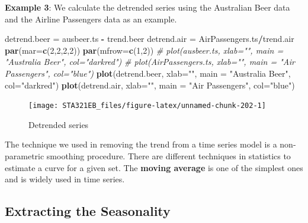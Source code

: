 \documentclass[
]{book}
\newenvironment{Shaded}{\begin{snugshade}}{\end{snugshade}}
\newcommand{\AttributeTok}[1]{\textcolor[rgb]{0.13,0.29,0.53}{#1}}
\newcommand{\CommentTok}[1]{\textcolor[rgb]{0.56,0.35,0.01}{\textit{#1}}}
\newcommand{\DecValTok}[1]{\textcolor[rgb]{0.00,0.00,0.81}{#1}}
\newcommand{\FunctionTok}[1]{\textcolor[rgb]{0.13,0.29,0.53}{\textbf{#1}}}
\newcommand{\NormalTok}[1]{#1}
\newcommand{\OtherTok}[1]{\textcolor[rgb]{0.56,0.35,0.01}{#1}}
\newcommand{\SpecialCharTok}[1]{\textcolor[rgb]{0.81,0.36,0.00}{\textbf{#1}}}
\newcommand{\StringTok}[1]{\textcolor[rgb]{0.31,0.60,0.02}{#1}}
\begin{document}
\textbf{Example 3}: We calculate the detrended series using the Australian Beer data and the Airline Passengers data as an example.

\begin{Shaded}
\begin{Highlighting}[]
\NormalTok{detrend.beer }\OtherTok{=}\NormalTok{ ausbeer.ts }\SpecialCharTok{{-}}\NormalTok{ trend.beer}
\NormalTok{detrend.air }\OtherTok{=}\NormalTok{ AirPassengers.ts}\SpecialCharTok{/}\NormalTok{trend.air}
\FunctionTok{par}\NormalTok{(}\AttributeTok{mar=}\FunctionTok{c}\NormalTok{(}\DecValTok{2}\NormalTok{,}\DecValTok{2}\NormalTok{,}\DecValTok{2}\NormalTok{,}\DecValTok{2}\NormalTok{))}
\FunctionTok{par}\NormalTok{(}\AttributeTok{mfrow=}\FunctionTok{c}\NormalTok{(}\DecValTok{1}\NormalTok{,}\DecValTok{2}\NormalTok{))}
\CommentTok{\# plot(ausbeer.ts, xlab="", main = "Australia Beer", col="darkred")}
\CommentTok{\# plot(AirPassengers.ts, xlab="", main = "Air Passengers", col="blue")}
\FunctionTok{plot}\NormalTok{(detrend.beer, }\AttributeTok{xlab=}\StringTok{""}\NormalTok{, }\AttributeTok{main =} \StringTok{"Australia Beer"}\NormalTok{, }\AttributeTok{col=}\StringTok{"darkred"}\NormalTok{)}
\FunctionTok{plot}\NormalTok{(detrend.air, }\AttributeTok{xlab=}\StringTok{""}\NormalTok{, }\AttributeTok{main =} \StringTok{"Air Passengers"}\NormalTok{, }\AttributeTok{col=}\StringTok{"blue"}\NormalTok{)}
\end{Highlighting}
\end{Shaded}

\begin{figure}

{\centering \texttt{[image: STA321EB\_files/figure-latex/unnamed-chunk-202-1]} 

}

\caption{Detrended series}\label{fig:unnamed-chunk-202}
\end{figure}

The technique we used in removing the trend from a time series model is a non-parametric smoothing procedure. There are different techniques in statistics to estimate a curve for a given set. The \textbf{moving average} is one of the simplest ones and is widely used in time series.

\hypertarget{extracting-the-seasonality}{%
\subsection{Extracting the Seasonality}\label{extracting-the-seasonality}}
\end{document}
